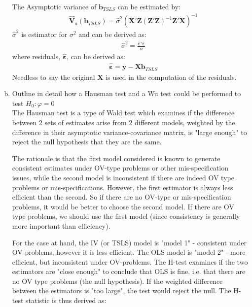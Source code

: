 \documentclass[11pt,reqno]{amsart}\usepackage[]{graphicx}\usepackage[]{color}
\newcommand{\mlt}[1]{\mathbf{#1}} %
\newcommand{\mgr}[1]{\mathbf{#1}}%
\newcommand{\kX}{\mlt{X}}
\newcommand{\ky}{\mlt{y}}
\newcommand{\kb}{\mlt{b}}
\begin{document}
\begin{enumerate}[(a)]
The Asymptotic variance  of $\kb_{TSLS}$ can be estimated by:
\begin{equation*}
\begin{split}
& \hat{\mlt{V}}_a(\kb_{TSLS})=\hat{\sigma}^2 (\kX'\mlt{Z}(\mlt{Z}'\mlt{Z})^{ - 1} \mlt{Z}'\kX)^{ - 1} 
\end{split}
\end{equation*}
$\hat{\sigma}^2$ is estimator for ${\sigma}^2$ and can be derived as:
\begin{equation*}
\begin{split}
& \hat{\sigma}^2=\frac{{\hat{\mgr{\varepsilon}} '\hat{\mgr{\varepsilon} }}}{n}
\end{split}
\end{equation*}
where residuals, $\hat{\mgr{\varepsilon}}$, can be derived as:
\begin{equation*}
\begin{split}
& \hat{\mgr{\varepsilon}}=\ky - \kX \kb_{TSLS}
\end{split}
\end{equation*}
Needless to say the original $\kX$ is used in the computation of the residuals. \\

\item Outline in detail how a Hausman test and a Wu test could be performed to test $H_0:\varphi= 0$\\

The Hausman test is a type of Wald test which examines if the difference between 2 sets of estimates arise from 2 different models, weighted by the difference in their asymptotic variance-covariance
matrix, is "large enough" to reject the null hypothesis that they are the same.

The rationale is that the first model considered is known to generate consistent estimates under OV-type problems or other mis-specification issues, while the second model is inconsistent if there are indeed OV
type problems or mis-specifications. However, the first estimator is always less efficient than the second. So if there are no OV-type or mis-specification problems, it would be better to choose the second model.
If there are OV type problems, we should use the first model (since consistency is generally more important than efficiency). 

For the case at hand, the IV (or TSLS) model is "model 1" - consistent under OV-problems, however it is less efficient. The OLS model is "model 2" - more efficient, but inconsistent under OV-problems. The H-test
examines if the two estimators are "close enough" to conclude that OLS is fine, i.e. that there are no OV type problems (the null hypothesis). If the weighted difference between the estimators is "too
large", the test would reject the null.
The H-test statistic is thus derived as:


\end{enumerate}
\end{document}
